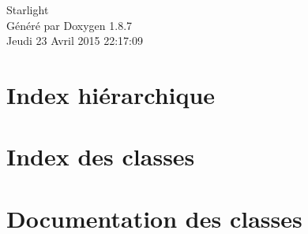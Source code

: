 \documentclass[twoside]{book}
\newcommand{\+}{\discretionary{\mbox{\scriptsize$\hookleftarrow$}}{}{}}
\newcommand{\clearemptydoublepage}{%
  \newpage{\pagestyle{empty}\cleardoublepage}%
}
\begin{document}
\hypersetup{pageanchor=false,
             bookmarks=true,
             bookmarksnumbered=true,
             pdfencoding=unicode
            }
\begin{titlepage}
\vspace*{7cm}
\begin{center}%
{\Large Starlight }\\
\vspace*{1cm}
{\large Généré par Doxygen 1.8.7}\\
\vspace*{0.5cm}
{\small Jeudi 23 Avril 2015 22:17:09}\\
\end{center}
\end{titlepage}
\clearemptydoublepage
\tableofcontents
\clearemptydoublepage
{}
\hypersetup{pageanchor=true}

\chapter{Index hiérarchique}

\chapter{Index des classes}

\chapter{Documentation des classes}













































\newpage
{}
{}
\printindex
\end{document}
